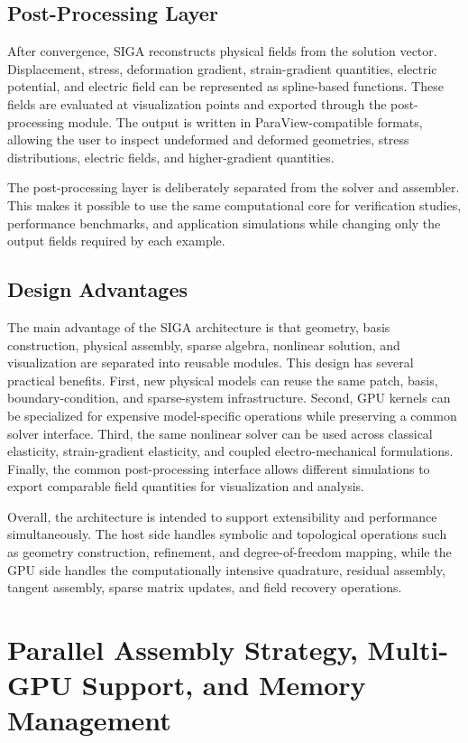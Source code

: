 \documentclass[11pt]{article}
\begin{document}
\subsection{Post-Processing Layer}

After convergence, SIGA reconstructs physical fields from the solution vector. Displacement, stress, deformation gradient, strain-gradient quantities, electric potential, and electric field can be represented as spline-based functions. These fields are evaluated at visualization points and exported through the post-processing module. The output is written in ParaView-compatible formats, allowing the user to inspect undeformed and deformed geometries, stress distributions, electric fields, and higher-gradient quantities.

The post-processing layer is deliberately separated from the solver and assembler. This makes it possible to use the same computational core for verification studies, performance benchmarks, and application simulations while changing only the output fields required by each example.

\subsection{Design Advantages}

The main advantage of the SIGA architecture is that geometry, basis construction, physical assembly, sparse algebra, nonlinear solution, and visualization are separated into reusable modules. This design has several practical benefits. First, new physical models can reuse the same patch, basis, boundary-condition, and sparse-system infrastructure. Second, GPU kernels can be specialized for expensive model-specific operations while preserving a common solver interface. Third, the same nonlinear solver can be used across classical elasticity, strain-gradient elasticity, and coupled electro-mechanical formulations. Finally, the common post-processing interface allows different simulations to export comparable field quantities for visualization and analysis.

Overall, the architecture is intended to support extensibility and performance simultaneously. The host side handles symbolic and topological operations such as geometry construction, refinement, and degree-of-freedom mapping, while the GPU side handles the computationally intensive quadrature, residual assembly, tangent assembly, sparse matrix updates, and field recovery operations.

\section{Parallel Assembly Strategy, Multi-GPU Support, and Memory Management}
\label{sec:parallel_assembly}
\end{document}
